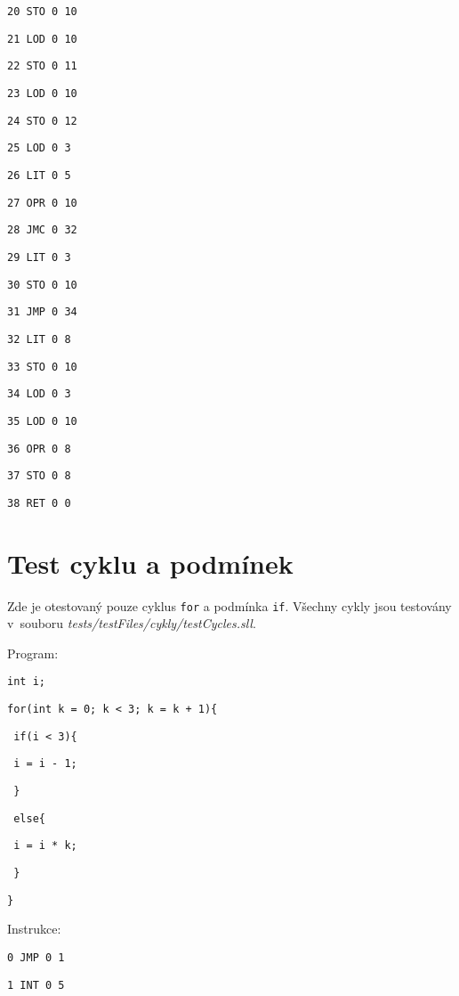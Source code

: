 \documentclass[czech]{thesiskiv}
\begin{document}
\texttt{20	STO	0	10  }

\texttt{21	LOD	0	10   }

\texttt{22	STO	0	11    }

\texttt{23	LOD	0	10     }

\texttt{24	STO	0	12      }

\texttt{25	LOD	0	3        }

\texttt{26	LIT	0	5 }

\texttt{27	OPR	0	10 }

\texttt{28	JMC	0	32  }

\texttt{29	LIT	0	3    }

\texttt{30	STO	0	10    }

\texttt{31	JMP	0	34     }

\texttt{32	LIT	0	8       }

\texttt{33	STO	0	10       }

\texttt{34	LOD	0	3         }

\texttt{35	LOD	0	10         }

\texttt{36	OPR	0	8           }

\texttt{37	STO	0	8            }

\texttt{38	RET	0	0             }



\section{Test cyklu a podmínek}

Zde je otestovaný pouze cyklus \texttt{for} a podmínka \texttt{if}.
Všechny cykly jsou testovány v~souboru \textit{tests/testFiles/cykly/testCycles.sll}.

\noindent Program:

\texttt{int i;}

\texttt{for(int k = 0; k < 3; k = k + 1)\{}
    
\texttt{    if(i < 3)\{ }

\texttt{        i = i - 1;}

\texttt{    \}             }

\texttt{    else\{          }

\texttt{        i = i * k;  }

\texttt{    \}            }

\texttt{\}                 }

\noindent Instrukce:

\texttt{0	JMP	0	1}

\texttt{1	INT	0	5}
\end{document}
